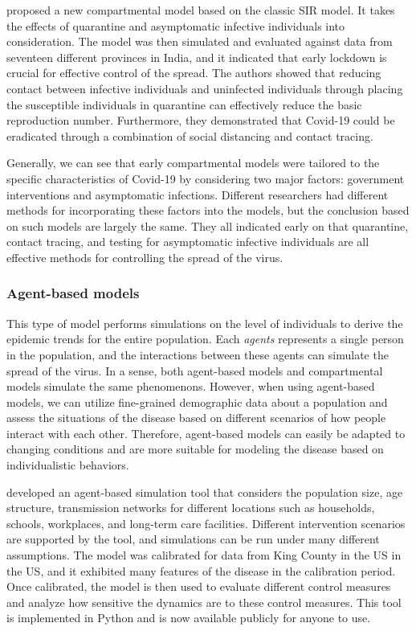 \citeauthor{sarkarModelingForecastingCOVID192020} \cite{sarkarModelingForecastingCOVID192020} proposed a new compartmental model based on the classic \gls{SIR} model.
It takes the effects of quarantine and asymptomatic infective individuals into consideration.
The model was then simulated and evaluated against data from seventeen different provinces in India, and it indicated that early lockdown is crucial for effective control of the spread.
The authors showed that reducing contact between infective individuals and uninfected individuals through placing the susceptible individuals in quarantine can effectively reduce the basic reproduction number.
Furthermore, they demonstrated that Covid-19 could be eradicated through a combination of social distancing and contact tracing.

Generally, we can see that early compartmental models were tailored to the specific characteristics of Covid-19 by considering two major factors: government interventions and asymptomatic infections.
Different researchers had different methods for incorporating these factors into the models, but the conclusion based on such models are largely the same.
They all indicated early on that quarantine, contact tracing, and testing for asymptomatic infective individuals are all effective methods for controlling the spread of the virus.

\subsubsection{Agent-based models}

This type of model performs simulations on the level of individuals to derive the epidemic trends for the entire population.
Each \textit{agents} represents a single person in the population, and the interactions between these agents can simulate the spread of the virus.
In a sense, both agent-based models and compartmental models simulate the same phenomenons.
However, when using agent-based models, we can utilize fine-grained demographic data about a population and assess the situations of the disease based on different scenarios of how people interact with each other.
Therefore, agent-based models can easily be adapted to changing conditions and are more suitable for modeling the disease based on individualistic behaviors.

\citeauthor{kerrCovasimAgentbasedModel2021} \cite{kerrCovasimAgentbasedModel2021} developed an agent-based simulation tool that considers the population size, age structure, transmission networks for different locations such as households, schools, workplaces, and long-term care facilities.
Different intervention scenarios are supported by the tool, and simulations can be run under many different assumptions.
The model was calibrated for data from King County in the \gls{US} in the \gls{US}, and it exhibited many features of the disease in the calibration period.
Once calibrated, the model is then used to evaluate different control measures and analyze how sensitive the dynamics are to these control measures.
This tool is implemented in Python and is now available publicly for anyone to use.

